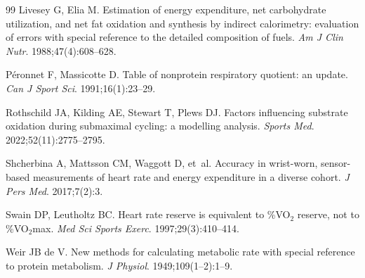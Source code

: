 \documentclass[10pt,a4paper]{article}
\begin{document}
\begin{thebibliography}{99}
Livesey G, Elia M.
\newblock Estimation of energy expenditure, net carbohydrate utilization, and net fat
  oxidation and synthesis by indirect calorimetry: evaluation of errors with special
  reference to the detailed composition of fuels.
\newblock \emph{Am J Clin Nutr}. 1988;47(4):608--628.

Péronnet F, Massicotte D.
\newblock Table of nonprotein respiratory quotient: an update.
\newblock \emph{Can J Sport Sci}. 1991;16(1):23--29.

Rothschild JA, Kilding AE, Stewart T, Plews DJ.
\newblock Factors influencing substrate oxidation during submaximal cycling: a modelling
  analysis.
\newblock \emph{Sports Med}. 2022;52(11):2775--2795.

Shcherbina A, Mattsson CM, Waggott D, et~al.
\newblock Accuracy in wrist-worn, sensor-based measurements of heart rate and energy
  expenditure in a diverse cohort.
\newblock \emph{J Pers Med}. 2017;7(2):3.

Swain DP, Leutholtz BC.
\newblock Heart rate reserve is equivalent to \%VO$_2$ reserve, not to
  \%VO$_2$max.
\newblock \emph{Med Sci Sports Exerc}. 1997;29(3):410--414.

Weir JB de V.
\newblock New methods for calculating metabolic rate with special reference to
  protein metabolism.
\newblock \emph{J Physiol}. 1949;109(1--2):1--9.

\end{thebibliography}
\end{document}

